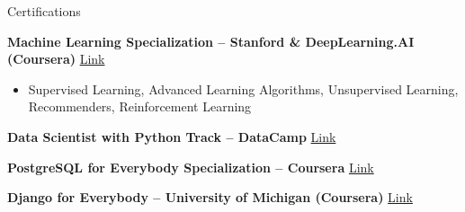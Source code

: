 \documentclass{resume}
\begin{document}
\begin{rSection}{Certifications}
\vspace{-1.25em}
\item \textbf{Machine Learning Specialization – Stanford \& DeepLearning.AI (Coursera)} \hfill \href{https://coursera.org/share/64d85e57fd2e7d9505479b5ecdfa6087}{Link}
\begin{itemize}
    \itemsep -3pt
    \item Supervised Learning, Advanced Learning Algorithms, Unsupervised Learning, Recommenders, Reinforcement Learning
\end{itemize}
\item \textbf{Data Scientist with Python Track – DataCamp} \hfill \href{https://www.datacamp.com/statement-of-accomplishment/track/b6453fc00e5e20271fec8bb4cc45a1396599745a}{Link}
\item \textbf{PostgreSQL for Everybody Specialization – Coursera} \hfill \href{https://coursera.org/share/7a0ce436a9420f6f940c17ed2e5ee724}{Link}
\item \textbf{Django for Everybody – University of Michigan (Coursera)} \hfill \href{https://coursera.org/share/7c99ec031a5df1581cc5392b567a7afc}{Link}
\end{rSection}
\end{document}
